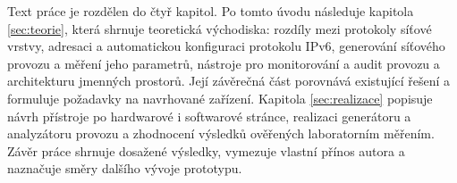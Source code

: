 Text práce je rozdělen do čtyř kapitol. Po tomto úvodu následuje kapitola \ref{sec:teorie}, která shrnuje teoretická východiska: rozdíly mezi protokoly síťové vrstvy, adresaci a automatickou konfiguraci protokolu IPv6, generování síťového provozu a měření jeho parametrů, nástroje pro monitorování a audit provozu a architekturu jmenných prostorů. Její závěrečná část porovnává existující řešení a formuluje požadavky na navrhované zařízení. Kapitola \ref{sec:realizace} popisuje návrh přístroje po hardwarové i softwarové stránce, realizaci generátoru a analyzátoru provozu a zhodnocení výsledků ověřených laboratorním měřením. Závěr práce shrnuje dosažené výsledky, vymezuje vlastní přínos autora a naznačuje směry dalšího vývoje prototypu.